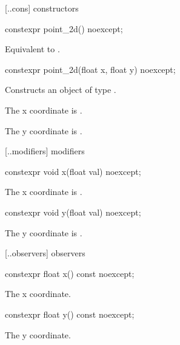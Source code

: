  [\iotwod.\pointtwod.cons] { constructors}

%
\begin{itemdecl}
constexpr point_2d() noexcept;
\end{itemdecl}
\begin{itemdescr}
\pnum
\effects
Equivalent to .
\end{itemdescr}

%
\begin{itemdecl}
constexpr point_2d(float x, float y) noexcept;
\end{itemdecl}
\begin{itemdescr}
\pnum
\effects
Constructs an object of type .

\pnum
The x coordinate is .

\pnum
The y coordinate is .
\end{itemdescr}

 [\iotwod.\pointtwod.modifiers]{ modifiers}

%
\begin{itemdecl}
constexpr void x(float val) noexcept;
\end{itemdecl}
\begin{itemdescr}
\pnum
\effects
The x coordinate is .
\end{itemdescr}

%
\begin{itemdecl}
constexpr void y(float val) noexcept;
\end{itemdecl}
\begin{itemdescr}
\pnum
\effects
The y coordinate is .
\end{itemdescr}

 [\iotwod.\pointtwod.observers]{ observers}

%
\begin{itemdecl}
constexpr float x() const noexcept;
\end{itemdecl}
\begin{itemdescr}
\pnum
\returns
The x coordinate.
\end{itemdescr}

%
\begin{itemdecl}
constexpr float y() const noexcept;
\end{itemdecl}
\begin{itemdescr}
\pnum
\returns
The y coordinate.
\end{itemdescr}

